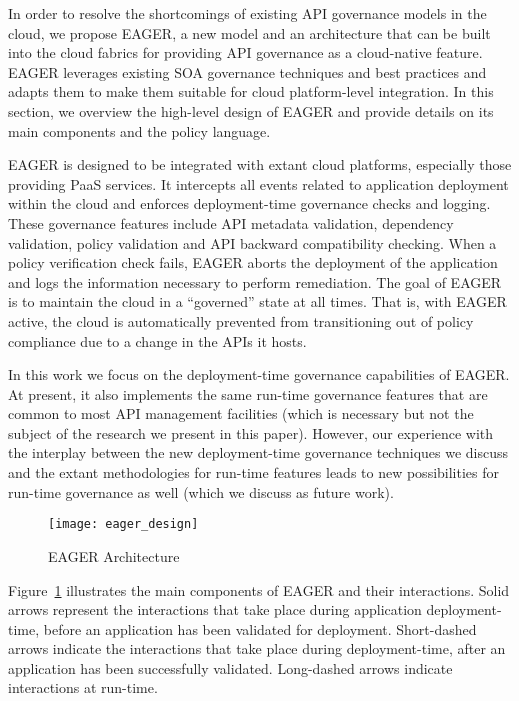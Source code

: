 In order to resolve the shortcomings of existing API governance models in the
cloud, we propose EAGER, a new model and an architecture that can be built
into the cloud fabrics for providing API governance as a cloud-native feature.
EAGER leverages existing SOA governance techniques and 
best practices and adapts them to make them
suitable for cloud platform-level integration.
In this section, we
overview the high-level design of EAGER and provide details on its main
components and the policy language.

EAGER is designed to be integrated with extant cloud platforms, 
especially those providing PaaS services. 
It intercepts all events related to application deployment within the cloud
and enforces deployment-time governance checks and
logging. 
These governance features include API metadata validation, 
dependency validation, policy validation and 
API backward compatibility
checking. When a policy verification check fails, 
EAGER aborts the deployment of the application and logs the information
necessary to perform remediation.  The goal of EAGER is to maintain the cloud
in a ``governed'' state at all times.  That is, with EAGER active, the cloud
is
automatically prevented from transitioning out of policy compliance due to a
change in the APIs it hosts.

In this work we focus on the deployment-time governance capabilities of EAGER. 
At present, it also implements the same run-time governance features that are
common to most API management facilities (which is necessary but not the
subject of the research we present in this paper).
However, our experience with the interplay between the new deployment-time
governance techniques we discuss and the extant methodologies for run-time
features leads to new possibilities for run-time governance as well (which we
discuss as future work).

\begin{figure}
\centering
\texttt{[image: eager\_design]}
\caption{EAGER Architecture}
\label{fig:eager_design}
\end{figure}

Figure~\ref{fig:eager_design} illustrates the main components of EAGER and
their interactions. Solid arrows represent the interactions that take place
during application deployment-time, before an application has been validated
for deployment. Short-dashed arrows indicate the interactions that take place
during deployment-time, after an application has been successfully validated.
Long-dashed arrows indicate interactions at run-time.

